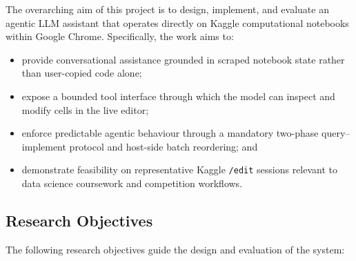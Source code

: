 The overarching aim of this project is to design, implement, and evaluate an agentic \ac{LLM} assistant that operates directly on Kaggle computational notebooks within Google Chrome. Specifically, the work aims to:

\begin{itemize}
  \item provide conversational assistance grounded in scraped notebook state rather than user-copied code alone;
  \item expose a bounded tool interface through which the model can inspect and modify cells in the live editor;
  \item enforce predictable agentic behaviour through a mandatory two-phase query--implement protocol and host-side batch reordering; and
  \item demonstrate feasibility on representative Kaggle \texttt{/edit} sessions relevant to data science coursework and competition workflows.
\end{itemize}

\subsection{Research Objectives}
\label{sec:objectives}

The following research objectives guide the design and evaluation of the system:

